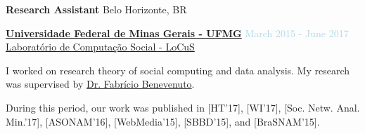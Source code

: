 \textbf{Research Assistant} \hfill {Belo Horizonte, BR}
\begin{outerlist}

\item[] \href{https://ufmg.br/}{\textbf{Universidade Federal de Minas Gerais - UFMG}}  \hfill {\textcolor{lightblue}{March 2015 - June 2017}}
\\ \href{https://www.dcc.ufmg.br/dcc/?q=pt-br/node/2728}{Laboratório de Computação Social - LoCuS}  \medskip 

        \begin{innerlist}[-]
        \item I worked on research theory of social computing and data analysis. My research was supervised by \href{https://homepages.dcc.ufmg.br/~fabricio/}{Dr. Fabrício Benevenuto}.
        \item During this period, our work was published in [HT'17], [WI'17], [Soc. Netw. Anal. Min.'17], [ASONAM'16], [WebMedia'15], [SBBD'15], and [BraSNAM'15]. 
        \end{innerlist}

\end{outerlist}

\medskip



